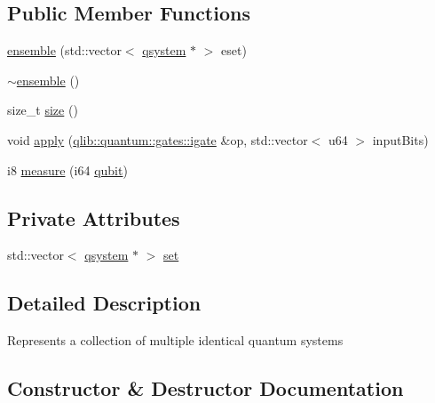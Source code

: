 \subsection*{Public Member Functions}
\begin{DoxyCompactItemize}
\item 
\hyperlink{classqlib_1_1quantum_1_1ensemble_a5e088d9ac7394f150f5a2affe0790f2a}{ensemble} (std\+::vector$<$ \hyperlink{classqlib_1_1quantum_1_1qsystem}{qsystem} $\ast$ $>$ eset)
\item 
\hyperlink{classqlib_1_1quantum_1_1ensemble_aae0c56d2d64d4be27b5ab976d60c2747}{$\sim$ensemble} ()
\item 
size\+\_\+t \hyperlink{classqlib_1_1quantum_1_1ensemble_a4b811e4778f5c845504ed8eec058dfe4}{size} ()
\item 
void \hyperlink{classqlib_1_1quantum_1_1ensemble_a9226b1108f8d45d052316f7c366f1d5a}{apply} (\hyperlink{classqlib_1_1quantum_1_1gates_1_1igate}{qlib\+::quantum\+::gates\+::igate} \&op, std\+::vector$<$ u64 $>$ input\+Bits)
\item 
i8 \hyperlink{classqlib_1_1quantum_1_1ensemble_ae5e3ebd119e1df6dbb966b7bb6222e5a}{measure} (i64 \hyperlink{classqlib_1_1quantum_1_1qubit}{qubit})
\end{DoxyCompactItemize}
\subsection*{Private Attributes}
\begin{DoxyCompactItemize}
\item 
std\+::vector$<$ \hyperlink{classqlib_1_1quantum_1_1qsystem}{qsystem} $\ast$ $>$ \hyperlink{classqlib_1_1quantum_1_1ensemble_ab77e11f30898f29060ff97236ec26319}{set}
\end{DoxyCompactItemize}


\subsection{Detailed Description}
Represents a collection of multiple identical quantum systems 

\subsection{Constructor \& Destructor Documentation}
